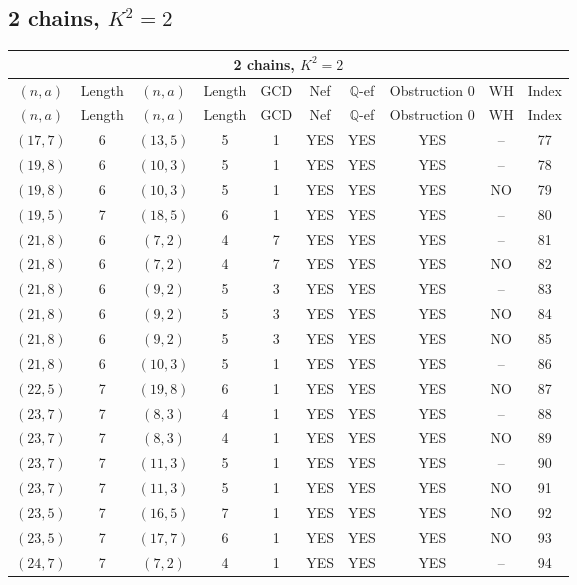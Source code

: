 \subsection{2 chains, $K^2 = 2$}
\begin{longtable}{|c|c|c|c|c|c|c|c|c|c|}
\hline
\multicolumn{10}{|c|}{2 chains, $K^2 = 2$}\\
\hline
$(n,a)$ & Length & $(n,a)$ & Length & GCD & Nef & $\mathbb Q$-ef & Obstruction 0 & WH & Index\\
\hline
\endfirsthead

\hline
$(n,a)$ & Length & $(n,a)$ & Length & GCD & Nef & $\mathbb Q$-ef & Obstruction 0 & WH & Index\\
\hline
\endhead
\hline
\endfoot

$(17, 7)$ & 6 & $(13, 5)$ & 5 & 1 & YES & YES & YES & -- & 77\\
$(19, 8)$ & 6 & $(10, 3)$ & 5 & 1 & YES & YES & YES & -- & 78\\
$(19, 8)$ & 6 & $(10, 3)$ & 5 & 1 & YES & YES & YES & NO & 79\\
$(19, 5)$ & 7 & $(18, 5)$ & 6 & 1 & YES & YES & YES & -- & 80\\
$(21, 8)$ & 6 & $(7, 2)$ & 4 & 7 & YES & YES & YES & -- & 81\\
$(21, 8)$ & 6 & $(7, 2)$ & 4 & 7 & YES & YES & YES & NO & 82\\
$(21, 8)$ & 6 & $(9, 2)$ & 5 & 3 & YES & YES & YES & -- & 83\\
$(21, 8)$ & 6 & $(9, 2)$ & 5 & 3 & YES & YES & YES & NO & 84\\
$(21, 8)$ & 6 & $(9, 2)$ & 5 & 3 & YES & YES & YES & NO & 85\\
$(21, 8)$ & 6 & $(10, 3)$ & 5 & 1 & YES & YES & YES & -- & 86\\
$(22, 5)$ & 7 & $(19, 8)$ & 6 & 1 & YES & YES & YES & NO & 87\\
$(23, 7)$ & 7 & $(8, 3)$ & 4 & 1 & YES & YES & YES & -- & 88\\
$(23, 7)$ & 7 & $(8, 3)$ & 4 & 1 & YES & YES & YES & NO & 89\\
$(23, 7)$ & 7 & $(11, 3)$ & 5 & 1 & YES & YES & YES & -- & 90\\
$(23, 7)$ & 7 & $(11, 3)$ & 5 & 1 & YES & YES & YES & NO & 91\\
$(23, 5)$ & 7 & $(16, 5)$ & 7 & 1 & YES & YES & YES & NO & 92\\
$(23, 5)$ & 7 & $(17, 7)$ & 6 & 1 & YES & YES & YES & NO & 93\\
$(24, 7)$ & 7 & $(7, 2)$ & 4 & 1 & YES & YES & YES & -- & 94\\

\end{longtable}

